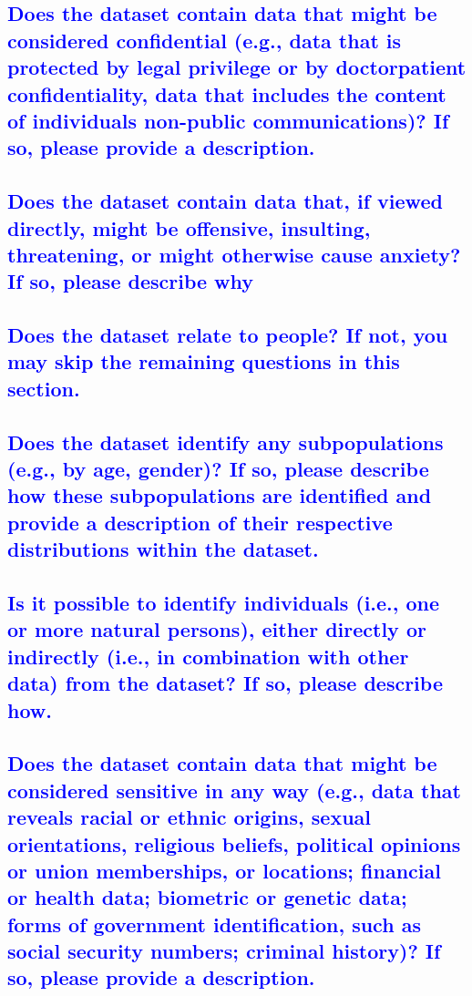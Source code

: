 \documentclass[letterpaper, 10 pt, conference]{ieeeconf}  %
\begin{document}
\textcolor{blue}{\subsection{Does the dataset contain data that might be considered confidential
(e.g., data that is protected by legal privilege or by doctorpatient confidentiality, data that includes the content of individuals non-public
communications)? If so, please provide a description.}}
\lipsum[1]

\textcolor{blue}{\subsection{Does the dataset contain data that, if viewed directly, might be offensive, insulting, threatening, or might otherwise cause anxiety? If so,
please describe why}}
\lipsum[1]

\textcolor{blue}{\subsection{Does the dataset relate to people? If not, you may skip the remaining
questions in this section.}}
\lipsum[1]

\textcolor{blue}{\subsection{Does the dataset identify any subpopulations (e.g., by age, gender)?
If so, please describe how these subpopulations are identified and provide
a description of their respective distributions within the dataset.}}
\lipsum[1]

\textcolor{blue}{\subsection{Is it possible to identify individuals (i.e., one or more natural persons), either directly or indirectly (i.e., in combination with other
data) from the dataset? If so, please describe how.}}
\lipsum[1]

\textcolor{blue}{\subsection{Does the dataset contain data that might be considered sensitive in
any way (e.g., data that reveals racial or ethnic origins, sexual orientations, religious beliefs, political opinions or union memberships, or
locations; financial or health data; biometric or genetic data; forms of
government identification, such as social security numbers; criminal
history)? If so, please provide a description.}}
\lipsum[1]
\end{document}
